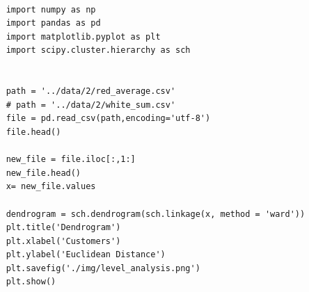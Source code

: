 \documentclass[UTF8]{ctexart}
\begin{document}
\lstset{language=python}
\begin{lstlisting}

	import numpy as np
	import pandas as pd
	import matplotlib.pyplot as plt
	import scipy.cluster.hierarchy as sch 
	
	
	path = '../data/2/red_average.csv'
	# path = '../data/2/white_sum.csv'
	file = pd.read_csv(path,encoding='utf-8')
	file.head()
	
	new_file = file.iloc[:,1:]
	new_file.head()
	x= new_file.values
	
	dendrogram = sch.dendrogram(sch.linkage(x, method = 'ward')) 
	plt.title('Dendrogram') 
	plt.xlabel('Customers') 
	plt.ylabel('Euclidean Distance') 
	plt.savefig('./img/level_analysis.png')
	plt.show()
\end{lstlisting}
\end{document}
